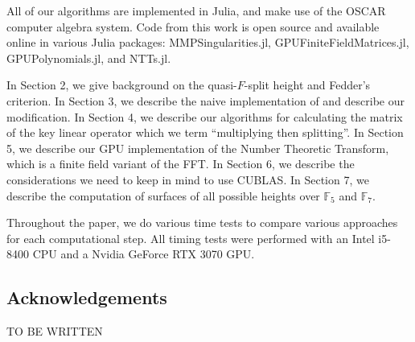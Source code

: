 All of our algorithms are implemented in Julia, and
make use of the OSCAR computer algebra system.
Code from this work is open source and available online 
in various
Julia packages: MMPSingularities.jl,
GPUFiniteFieldMatrices.jl, GPUPolynomials.jl,
and NTTs.jl.

In Section 2, we give background on the quasi-\(F\)-split height
and Fedder's criterion.
In Section 3, we describe the naive implementation of
\cite[Theorem~C]{kty-2022-fedder} and describe
our modification.
In Section 4, we describe our algorithms for calculating the matrix
of the key linear operator which we term ``multiplying then splitting''.
In Section 5, we describe our GPU implementation of the Number Theoretic
Transform, which is a finite field variant of the FFT.
In Section 6, we describe the considerations we need to keep in mind
to use CUBLAS.
In Section 7, we describe the computation of surfaces of all possible
heights over \(\mathbb{F}_{5}\) and \(\mathbb{F}_{7}\).


Throughout the paper, we do various time tests to compare various
approaches for each computational step.
All timing tests were performed with 
an Intel i5-8400 CPU and a Nvidia GeForce RTX 3070 GPU.

\subsection{Acknowledgements}

TO BE WRITTEN

